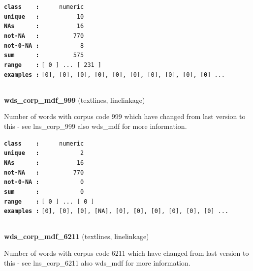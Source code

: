 \documentclass[]{article}
\begin{document}
\textbf{\texttt{class\ \ \ \ :}} \texttt{~~~~~numeric}\\
\textbf{\texttt{unique\ \ \ :}} \texttt{~~~~~~~~~~10}\\
\textbf{\texttt{NAs\ \ \ \ \ \ :}} \texttt{~~~~~~~~~~16}\\
\textbf{\texttt{not-NA\ \ \ :}} \texttt{~~~~~~~~~770}\\
\textbf{\texttt{not-0-NA\ :}} \texttt{~~~~~~~~~~~8}\\
\textbf{\texttt{sum\ \ \ \ \ \ :}} \texttt{~~~~~~~~~575}\\
\textbf{\texttt{range\ \ \ \ :}}
\texttt{{[}\ 0\ {]}\ ...\ {[}\ 231\ {]}}\\
\textbf{\texttt{examples\ :}}
\texttt{{[}0{]},\ {[}0{]},\ {[}0{]},\ {[}0{]},\ {[}0{]},\ {[}0{]},\ {[}0{]},\ {[}0{]},\ {[}0{]},\ {[}0{]}\ ...}\\

~

\textbf{wds\_corp\_mdf\_999} (textlines, linelinkage)

Number of words with corpus code 999 which have changed from last
version to this - see lns\_corp\_999 also wds\_mdf for more information.

\textbf{\texttt{class\ \ \ \ :}} \texttt{~~~~~numeric}\\
\textbf{\texttt{unique\ \ \ :}} \texttt{~~~~~~~~~~~2}\\
\textbf{\texttt{NAs\ \ \ \ \ \ :}} \texttt{~~~~~~~~~~16}\\
\textbf{\texttt{not-NA\ \ \ :}} \texttt{~~~~~~~~~770}\\
\textbf{\texttt{not-0-NA\ :}} \texttt{~~~~~~~~~~~0}\\
\textbf{\texttt{sum\ \ \ \ \ \ :}} \texttt{~~~~~~~~~~~0}\\
\textbf{\texttt{range\ \ \ \ :}}
\texttt{{[}\ 0\ {]}\ ...\ {[}\ 0\ {]}}\\
\textbf{\texttt{examples\ :}}
\texttt{{[}0{]},\ {[}0{]},\ {[}0{]},\ {[}NA{]},\ {[}0{]},\ {[}0{]},\ {[}0{]},\ {[}0{]},\ {[}0{]},\ {[}0{]}\ ...}\\

~

\textbf{wds\_corp\_mdf\_6211} (textlines, linelinkage)

Number of words with corpus code 6211 which have changed from last
version to this - see lns\_corp\_6211 also wds\_mdf for more
information.
\end{document}
